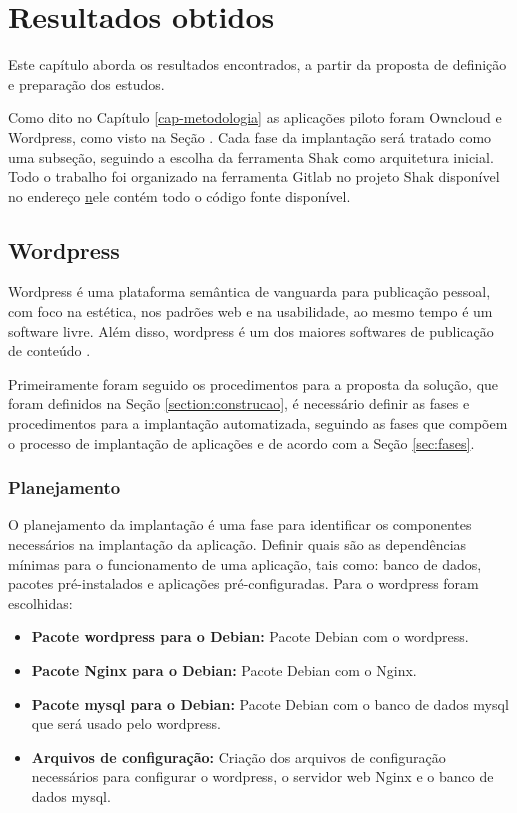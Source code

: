 \chapter{Resultados obtidos}
\label{cap-resultados}

Este capítulo aborda os resultados encontrados, a partir da proposta de
definição e preparação dos estudos. 

Como dito no Capítulo \ref{cap-metodologia}
as aplicações piloto foram Owncloud e Wordpress, como visto na Seção 
\label{subsection:validacao}. Cada fase da implantação será tratado como uma 
subseção, seguindo a escolha da ferramenta Shak como arquitetura inicial. Todo 
o trabalho foi organizado na ferramenta Gitlab no projeto Shak disponível no endereço 
\href{https://gitlab.com/Shak/Shak/} nele contém todo o código fonte disponível.

\section{Wordpress}
\label{sub:wordpress}

Wordpress é uma plataforma semântica de vanguarda para publicação pessoal, 
com foco na estética, nos padrões web e na usabilidade, ao mesmo tempo é 
um software livre. Além disso, wordpress é um dos maiores softwares de 
publicação de conteúdo \cite{wordpress}. 

Primeiramente foram seguido os procedimentos para a proposta da solução, que foram
 definidos 
na Seção \ref{section:construcao}, é
necessário definir as fases e procedimentos para a implantação automatizada,
seguindo as fases que compõem o processo de implantação de aplicações e de acordo
com a Seção \ref{sec:fases}.

\subsection{Planejamento}

O planejamento da implantação é uma fase para identificar os componentes
necessários na implantação da aplicação. Definir quais são as dependências mínimas
para o funcionamento de uma aplicação, tais como: banco de dados, pacotes
pré-instalados e aplicações pré-configuradas. Para o wordpress foram escolhidas:

\begin{itemize}
   \item \textbf{Pacote wordpress para o Debian:} Pacote Debian com o wordpress.
   \item \textbf{Pacote Nginx para o Debian:} Pacote Debian com o Nginx.
   \item \textbf{Pacote mysql para o Debian:} Pacote Debian com o banco de dados mysql
   que será usado pelo wordpress.
   \item \textbf{Arquivos de configuração:} Criação dos arquivos de configuração
   necessários para configurar o wordpress, o servidor web Nginx e o banco de dados
   mysql.
\end{itemize}


